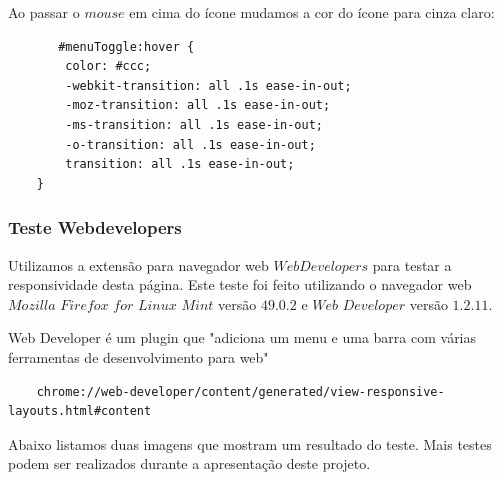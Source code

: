 	Ao passar o $mouse$ em cima do ícone mudamos a cor do ícone para cinza claro:
	
	
		\begin{lstlisting}
	   #menuToggle:hover {
        color: #ccc;
        -webkit-transition: all .1s ease-in-out;
        -moz-transition: all .1s ease-in-out;
        -ms-transition: all .1s ease-in-out;
        -o-transition: all .1s ease-in-out;
        transition: all .1s ease-in-out;
    }
\end{lstlisting}
\subsubsection{Teste Webdevelopers}	  

    Utilizamos a extensão para navegador web $Web Developers$ para testar a responsividade desta página. Este teste foi feito utilizando o navegador web $Mozilla$ $Firefox$ $for$ $Linux$ $Mint$ versão $49.0.2$ e $Web$ $Developer$ versão $1.2.11$.
    
    Web Developer é um plugin que "adiciona um menu e uma barra com várias ferramentas de desenvolvimento para web"
    
    
\begin{lstlisting}
    chrome://web-developer/content/generated/view-responsive-layouts.html#content
\end{lstlisting}

	Abaixo listamos duas imagens que mostram um resultado do teste. Mais testes podem ser realizados durante a apresentação deste projeto.
	
